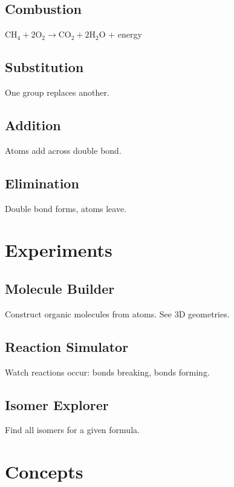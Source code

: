 \documentclass[
  11pt,
  letterpaper,
  twoside,
  openright]{book}
\begin{document}
\subsection{Combustion}\label{combustion}

\(\text{CH}_4 + 2\text{O}_2 \to \text{CO}_2 + 2\text{H}_2\text{O}\) +
energy

\subsection{Substitution}\label{substitution}

One group replaces another.

\subsection{Addition}\label{addition}

Atoms add across double bond.

\subsection{Elimination}\label{elimination}

Double bond forms, atoms leave.

\section{Experiments}\label{experiments-6}

\subsection{Molecule Builder}\label{molecule-builder}

Construct organic molecules from atoms. See 3D geometries.

\subsection{Reaction Simulator}\label{reaction-simulator}

Watch reactions occur: bonds breaking, bonds forming.

\subsection{Isomer Explorer}\label{isomer-explorer}

Find all isomers for a given formula.

\section{Concepts}\label{concepts-6}
\end{document}
